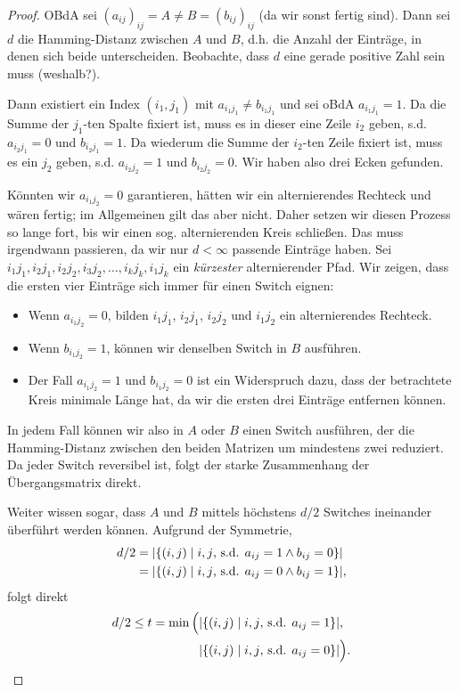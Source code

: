 \begin{proof}
    OBdA sei $(a_{ij})_{ij} = A \ne B = (b_{ij})_{ij}$ (da wir sonst fertig sind).
    Dann sei $d$ die Hamming-Distanz zwischen $A$ und $B$, d.h. die Anzahl der Einträge, in denen sich beide unterscheiden.
    Beobachte, dass $d$ eine gerade positive Zahl sein muss (weshalb?).

    Dann existiert ein Index $(i_1, j_1)$ mit $a_{i_1j_1} \ne b_{i_1j_1}$ und sei oBdA $a_{i_1j_1} = 1$.
    Da die Summe der $j_1$-ten Spalte fixiert ist, muss es in dieser eine Zeile $i_2$ geben, s.d. $a_{i_2j_1} = 0$ und $b_{i_2j_1} = 1$.
    Da wiederum die Summe der $i_2$-ten Zeile fixiert ist, muss es ein $j_2$ geben, s.d. $a_{i_2j_2} = 1$ und $b_{i_2j_2} = 0$.
    Wir haben also drei Ecken gefunden.

    Könnten wir $a_{i_1j_2} = 0$ garantieren, hätten wir ein alternierendes Rechteck und wären fertig;
    im Allgemeinen gilt das aber nicht.
    Daher setzen wir diesen Prozess so lange fort, bis wir einen sog. alternierenden Kreis schließen.
    Das muss irgendwann passieren, da wir nur $d < \infty$ passende Einträge haben.
    Sei $i_1j_1, i_2j_1, i_2j_2, i_3j_2, \ldots, i_kj_k, i_1j_k$ ein \emph{kürzester} alternierender Pfad.
    Wir zeigen, dass die ersten vier Einträge sich immer für einen Switch eignen:
    \begin{itemize}
        \item Wenn $a_{i_1j_2} = 0$, bilden $i_1j_1$, $i_2j_1$, $i_2j_2$ und $i_1j_2$ ein alternierendes Rechteck.
        \item Wenn $b_{i_1j_2} = 1$, können wir denselben Switch in $B$ ausführen.
        \item Der Fall $a_{i_1j_2} = 1$ und $b_{i_1j_2} = 0$ ist ein Widerspruch dazu, dass der betrachtete Kreis minimale Länge hat, da wir die ersten drei Einträge entfernen können.
    \end{itemize}

    In jedem Fall können wir also in $A$ oder $B$ einen Switch ausführen, der die Hamming-Distanz zwischen den beiden Matrizen um mindestens zwei reduziert.
    Da jeder Switch reversibel ist, folgt der starke Zusammenhang der Übergangsmatrix direkt.

    Weiter wissen sogar, dass $A$ und $B$ mittels höchstens $d/2$ Switches ineinander überführt werden können.
    Aufgrund der Symmetrie,
    \begin{align}
        d/2 & = \lvert \left\{ (i, j) \mid i, j \text{, s.d. } a_{ij} = 1 \land b_{ij} = 0\right\}\rvert  \\
            & = \lvert \left\{ (i, j) \mid i, j \text{, s.d. } a_{ij} = 0 \land b_{ij} = 1\right\}\rvert,
    \end{align}
    folgt direkt
    \begin{align}
        d/2 \le t =  \min\Big(
         & \lvert \left\{ (i, j) \mid i, j \text{, s.d. } a_{ij} = 1\right\}\rvert,       \\
         & \lvert \left\{ (i, j) \mid i, j \text{, s.d. } a_{ij} = 0\right\}\rvert  \Big).
    \end{align}
\end{proof}

